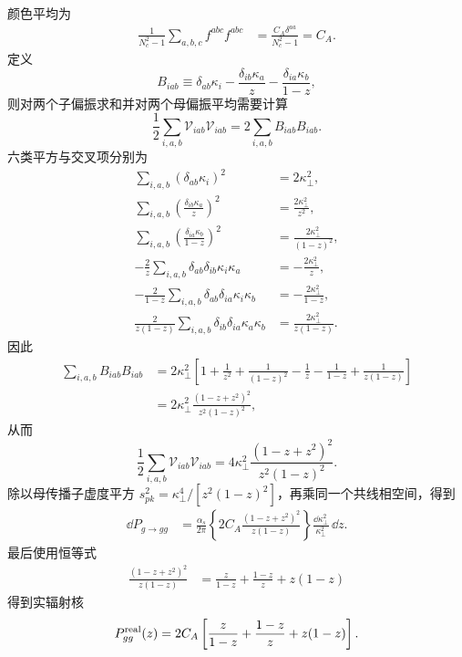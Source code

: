 \begin{derivation}[最低阶部分子分裂核]
颜色平均为
\begin{align*}
 \frac1{N_c^2-1}\sum_{a,b,c}f^{abc}f^{abc}
 &=\frac{C_A\delta^{aa}}{N_c^2-1}
 =C_A.
\end{align*}
定义
\begin{equation*}
 B_{iab}
 \equiv
 \delta_{ab}\kappa_i
 -\frac{\delta_{ib}\kappa_a}{z}
 -\frac{\delta_{ia}\kappa_b}{1-z},
\end{equation*}
则对两个子偏振求和并对两个母偏振平均需要计算
\begin{equation*}
 \frac12\sum_{i,a,b}\mathcal V_{iab}\mathcal V_{iab}
 =2\sum_{i,a,b}B_{iab}B_{iab}.
\end{equation*}
六类平方与交叉项分别为
\begin{align*}
 \sum_{i,a,b}(\delta_{ab}\kappa_i)^2
 &=2\kappa_\perp^2,\\
 \sum_{i,a,b}\left(\frac{\delta_{ib}\kappa_a}{z}\right)^2
 &=\frac{2\kappa_\perp^2}{z^2},\\
 \sum_{i,a,b}\left(\frac{\delta_{ia}\kappa_b}{1-z}\right)^2
 &=\frac{2\kappa_\perp^2}{(1-z)^2},\\
 -\frac{2}{z}
 \sum_{i,a,b}\delta_{ab}\delta_{ib}\kappa_i \kappa_a
 &=-\frac{2\kappa_\perp^2}{z},\\
 -\frac{2}{1-z}
 \sum_{i,a,b}\delta_{ab}\delta_{ia}\kappa_i \kappa_b
 &=-\frac{2\kappa_\perp^2}{1-z},\\
 \frac{2}{z(1-z)}
 \sum_{i,a,b}\delta_{ib}\delta_{ia}\kappa_a\kappa_b
 &=\frac{2\kappa_\perp^2}{z(1-z)}.
\end{align*}
因此
\begin{align*}
 \sum_{i,a,b}B_{iab}B_{iab}
 &=2\kappa_\perp^2
 \left[
 1+\frac1{z^2}+\frac1{(1-z)^2}
 -\frac1z-\frac1{1-z}+\frac1{z(1-z)}
 \right]\\
 &=2\kappa_\perp^2
 \frac{(1-z+z^2)^2}{z^2(1-z)^2},
\end{align*}
从而
\begin{equation*}
 \frac12\sum_{i,a,b}\mathcal V_{iab}\mathcal V_{iab}
 =4\kappa_\perp^2
 \frac{(1-z+z^2)^2}{z^2(1-z)^2}.
\end{equation*}
除以母传播子虚度平方 $s_{pk}^2=\kappa_\perp^4/[z^2(1-z)^2]$，再乘同一个共线相空间，得到
\begin{align*}
 \dd P_{g\to gg}
 &=\frac{\alpha_s}{2\pi}
 \left\{2C_A
 \frac{(1-z+z^2)^2}{z(1-z)}\right\}
 \frac{\dd\kappa_\perp^2}{\kappa_\perp^2}\,\dd z.
\end{align*}
最后使用恒等式
\begin{align*}
 \frac{(1-z+z^2)^2}{z(1-z)}
 &=\frac{z}{1-z}+\frac{1-z}{z}+z(1-z)
\end{align*}
得到实辐射核
\begin{equation*}
 P_{gg}^{\rm real}(z)
 =2C_A\left[
 \frac{z}{1-z}+\frac{1-z}{z}+z(1-z)
 \right].
\end{equation*}


\end{derivation}
